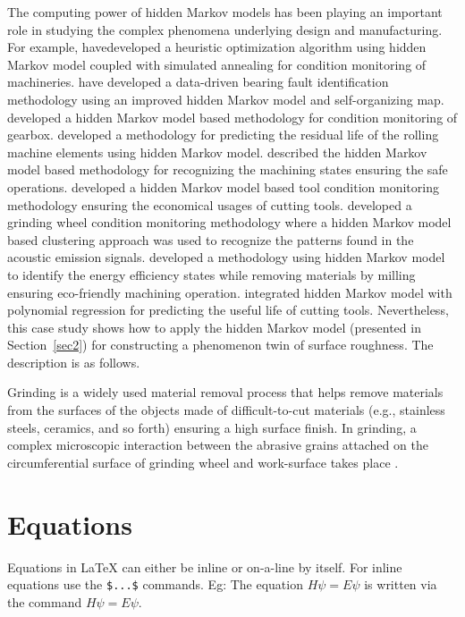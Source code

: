 \documentclass{CUP-JNL-DCE}
\begin{document}
The computing power of hidden Markov models has been playing an important
role in studying the complex phenomena underlying design and manufacturing.
For example, \cite{Liao2016} have\break developed a heuristic optimization
algorithm using hidden Markov model coupled with simulated annealing for
condition monitoring of machineries. \cite{Li2018} have developed a
data-driven bearing fault identification methodology using an improved
hidden Markov model and self-organizing map. \cite{Mba2018} developed a
hidden Markov model based methodology for condition monitoring of gearbox.
\cite{Zhang2018} developed a methodology for predicting the residual life
of the rolling machine elements using hidden Markov model. \cite{Xie2016}
described the hidden Markov model based methodology for recognizing the
machining states ensuring the safe operations. \cite{Bhat2016} developed
a hidden Markov model based tool condition monitoring methodology ensuring
the economical usages of cutting tools. \cite{Liao2006} developed a
grinding wheel condition monitoring methodology where a hidden Markov model
based clustering approach was used to recognize the patterns found in the
acoustic emission signals. \cite{Cai2018} developed a methodology using
hidden Markov model to identify the energy efficiency states while removing
materials by milling ensuring eco-friendly machining operation. \cite{Kumar2018}
integrated hidden Markov model with polynomial regression for
predicting the useful life of cutting tools. Nevertheless, this case study
shows how to apply the hidden Markov model (presented in Section~\ref{sec2}) for
constructing a phenomenon twin of surface roughness. The description is as
follows.

Grinding is a widely used material removal process that helps remove
materials from the surfaces of the objects made of difficult-to-cut
materials (e.g., stainless steels, ceramics, and so forth) ensuring a high
surface finish. In grinding, a complex microscopic interaction between the
abrasive grains attached on the circumferential surface of grinding wheel
and work-surface takes place \citep{Ullah2019}.


\section{Equations}

Equations in \LaTeX{} can either be inline or on-a-line by itself. For
inline equations use the \verb+$...$+ commands. Eg: The equation
$H\psi = E \psi$ is written via the command $H \psi = E \psi$.
\end{document}
